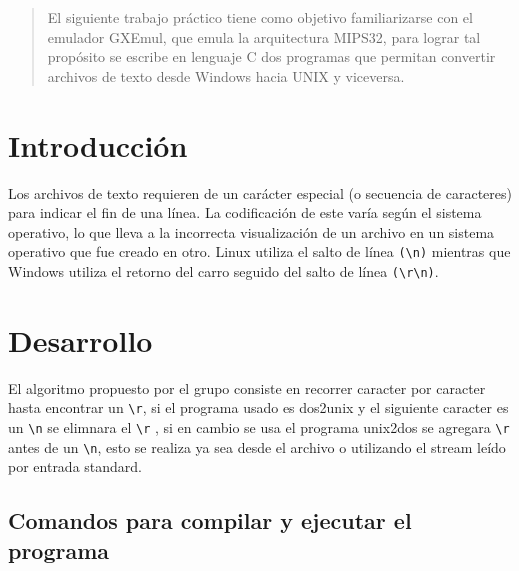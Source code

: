 \documentclass[a4paper]{article}
\begin{document}

\fecha{\today}



\maketitle

\renewcommand{\abstractname}{Resumen} 
\begin{abstract}
El siguiente trabajo práctico tiene como objetivo familiarizarse con el emulador GXEmul, que emula la arquitectura MIPS32, para lograr tal propósito se escribe en lenguaje C dos programas que permitan convertir archivos de texto desde Windows hacia UNIX y viceversa.
\end{abstract}


\section{Introducción}
Los archivos de texto requieren de un carácter especial (o secuencia de caracteres) para indicar el fin de una línea. La codificación de este varía según el sistema operativo, lo que lleva a la incorrecta visualización de un archivo en un sistema operativo que fue creado en otro. Linux utiliza el salto de línea \verb|(\n)| mientras que Windows utiliza el retorno del carro seguido del salto de línea \verb|(\r\n)|.

\section{Desarrollo}

El algoritmo propuesto por el grupo consiste en recorrer caracter por caracter hasta encontrar un \verb|\r|, si el programa usado es dos2unix y el siguiente caracter es un \verb|\n| se elimnara el \verb|\r| , si en cambio se usa el programa unix2dos se agregara \verb|\r| antes de un \verb|\n|, esto se realiza ya sea desde el archivo o utilizando el stream leído por entrada standard.


\subsection{Comandos para compilar y ejecutar el programa}
\end{document}
